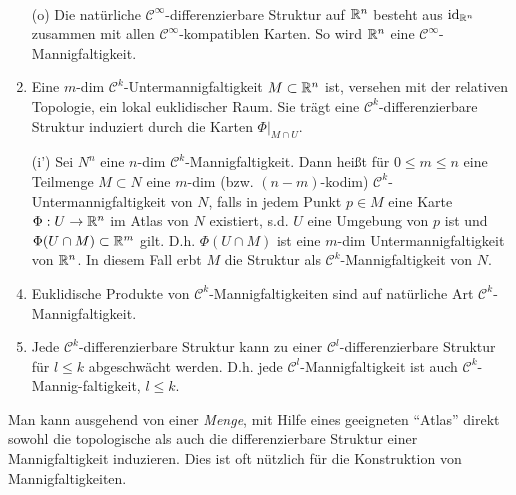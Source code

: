 \begin{example}\
\begin{enumerate}
\item[(o)] Die natürliche $\mathcal{C}^\infty$-differenzierbare Struktur auf $\mathbb{R}^n$ besteht aus $\operatorname{id}_{\mathbb{R}^n}$ zusammen mit allen $\mathcal{C}^\infty$-kompatiblen Karten. So wird $\mathbb{R}^n$ eine $\mathcal{C}^\infty$-Mannigfaltigkeit.
\item Eine $m$-dim $\mathcal{C}^k$-Untermannigfaltigkeit $M\subset\mathbb{R}^n$ ist, versehen mit der relativen Topologie, ein lokal euklidischer Raum. Sie trägt eine $\mathcal{C}^k$-differenzierbare Struktur induziert durch die Karten $\Phi|_{M\cap U}$.
\item[(i')] Sei $N^n$ eine $n$-dim $\mathcal{C}^k$-Mannigfaltigkeit. Dann heißt für $0\leq m \leq n$ eine Teilmenge $M\subset N$ eine $m$-dim (bzw. $(n-m)$-kodim) $\mathcal{C}^k$-Untermannigfaltigkeit von $N$, falls in jedem Punkt  $p\in M$ eine Karte $\Phi:U\to \mathbb{R}^n$ im Atlas von $N$ existiert, s.d. $U$ eine Umgebung von $p$ ist und $\Phi(U\cap M)\subset \mathbb{R}^m$ gilt. D.h. $\Phi(U\cap M)$ ist eine $m$-dim Untermannigfaltigkeit von $\mathbb{R}^n$. In diesem Fall erbt $M$ die Struktur als $\mathcal{C}^k$-Mannigfaltigkeit von $N$.
\item Euklidische Produkte von $\mathcal{C}^k$-Mannigfaltigkeiten sind auf natürliche Art $\mathcal{C}^k$-Mannigfaltigkeit.
\item Jede $\mathcal{C}^k$-differenzierbare Struktur kann zu einer $\mathcal{C}^l$-differenzierbare Struktur für $l\leq k$ abgeschwächt werden. D.h. jede $\mathcal{C}^l$-Mannigfaltigkeit ist auch $\mathcal{C}^k$-Mannig-faltigkeit, $l\leq k$.
\end{enumerate}
\end{example}
 Man kann ausgehend von einer \emph{Menge}, mit Hilfe eines geeigneten ``Atlas'' direkt sowohl die topologische als auch die differenzierbare Struktur einer Mannigfaltigkeit induzieren. Dies ist oft nützlich für die Konstruktion von Mannigfaltigkeiten.

